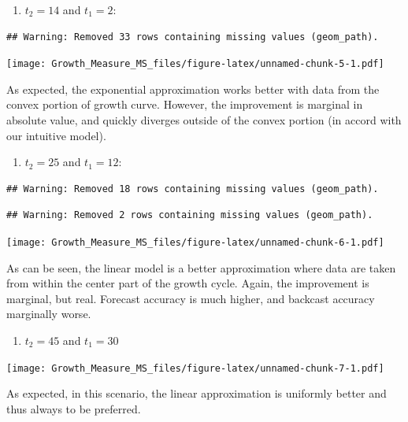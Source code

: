 \documentclass[]{article}
\providecommand{\tightlist}{%
  \setlength{\itemsep}{0pt}\setlength{\parskip}{0pt}}
\begin{document}
\begin{enumerate}
\def\labelenumi{\arabic{enumi})}
\tightlist
\item
  \(t_2 = 14\) and \(t_1=2\):
\end{enumerate}

\begin{verbatim}
## Warning: Removed 33 rows containing missing values (geom_path).
\end{verbatim}

\texttt{[image: Growth\_Measure\_MS\_files/figure-latex/unnamed-chunk-5-1.pdf]}

As expected, the exponential approximation works better with data from
the convex portion of growth curve. However, the improvement is marginal
in absolute value, and quickly diverges outside of the convex portion
(in accord with our intuitive model).

\begin{enumerate}
\def\labelenumi{\arabic{enumi})}
\setcounter{enumi}{1}
\tightlist
\item
  \(t_2 = 25\) and \(t_1 = 12\):
\end{enumerate}

\begin{verbatim}
## Warning: Removed 18 rows containing missing values (geom_path).
\end{verbatim}

\begin{verbatim}
## Warning: Removed 2 rows containing missing values (geom_path).
\end{verbatim}

\texttt{[image: Growth\_Measure\_MS\_files/figure-latex/unnamed-chunk-6-1.pdf]}

As can be seen, the linear model is a better approximation where data
are taken from within the center part of the growth cycle. Again, the
improvement is marginal, but real. Forecast accuracy is much higher, and
backcast accuracy marginally worse.

\begin{enumerate}
\def\labelenumi{\arabic{enumi})}
\setcounter{enumi}{2}
\tightlist
\item
  \(t_2=45\) and \(t_1=30\)
\end{enumerate}

\texttt{[image: Growth\_Measure\_MS\_files/figure-latex/unnamed-chunk-7-1.pdf]}

As expected, in this scenario, the linear approximation is uniformly
better and thus always to be preferred.
\end{document}
